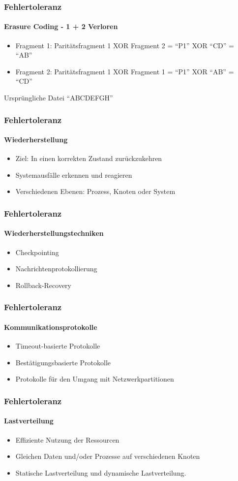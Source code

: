 \begin{frame}
  \frametitle{Fehlertoleranz}
  \framesubtitle{Erasure Coding - 1 + 2 Verloren}
  \begin{itemize}
  \item Fragment 1: Paritätsfragment 1 XOR Fragment 2 = \enquote{P1} XOR \enquote{CD} = \enquote{AB}
  \item Fragment 2: Paritätsfragment 1 XOR Fragment 1 = \enquote{P1} XOR \enquote{AB} = \enquote{CD}
  \end{itemize}  
  Ursprüngliche Datei \enquote{ABCDEFGH} 
\end{frame}

\begin{frame}
  \frametitle{Fehlertoleranz}
  \framesubtitle{Wiederherstellung}
  \begin{itemize}
    \item Ziel: In einen korrekten Zustand zurückzukehren
    \item Systemausfälle erkennen und reagieren
    \item Verschiedenen Ebenen: Prozess, Knoten oder System
  \end{itemize}
\end{frame}

\begin{frame}
  \frametitle{Fehlertoleranz}
  \framesubtitle{Wiederherstellungstechniken}
  \begin{itemize}
    \item Checkpointing
    \item Nachrichtenprotokollierung
    \item Rollback-Recovery
  \end{itemize}
\end{frame}

\begin{frame}
  \frametitle{Fehlertoleranz}
  \framesubtitle{Kommunikationsprotokolle}
  \begin{itemize}
    \item Timeout-basierte Protokolle 
    \item Bestätigungsbasierte Protokolle
    \item Protokolle für den Umgang mit Netzwerkpartitionen
  \end{itemize}
\end{frame}

\begin{frame}
  \frametitle{Fehlertoleranz}
  \framesubtitle{Lastverteilung}
  \begin{itemize}
    \item Effiziente Nutzung der Ressourcen
    \item Gleichen Daten und/oder Prozesse auf verschiedenen Knoten
    \item Statische Lastverteilung und dynamische Lastverteilung.
  \end{itemize}
\end{frame}

